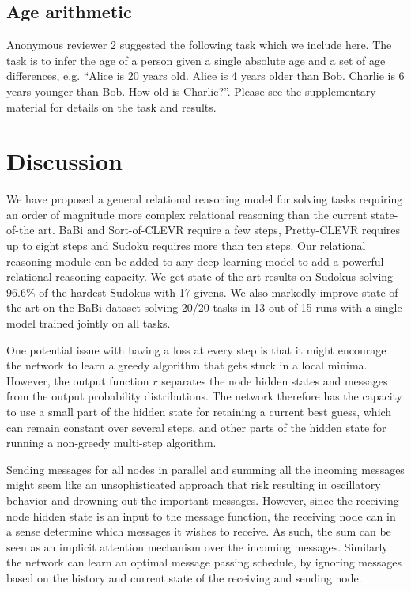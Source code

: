 \documentclass{article}
\newcommand{\rbp}[1]{

}
\begin{document}
\subsection{Age arithmetic}
Anonymous reviewer 2 suggested the following task which we include here.
The task is to infer the age of a person given a single absolute age and a set of age differences, e.g. ``Alice is 20 years old. Alice is 4 years older than Bob. Charlie is 6 years younger than Bob. How old is Charlie?''. Please see the supplementary material for details on the task and results.

\section{Discussion} 

\rbp{This section could use some Ulrich magic :)}

We have proposed a general relational reasoning model for solving tasks requiring an order of magnitude more complex relational reasoning than the current state-of-the art. BaBi and Sort-of-CLEVR require a few steps, Pretty-CLEVR requires up to eight steps and Sudoku requires more than ten steps.
Our relational reasoning module can be added to any deep learning model to add a powerful relational reasoning capacity.
We get state-of-the-art results on Sudokus solving 96.6\% of the hardest Sudokus with 17 givens.
We also markedly improve state-of-the-art on the BaBi dataset solving 20/20 tasks in 13 out of 15 runs with a single model trained jointly on all tasks.

One potential issue with having a loss at every step is that it might encourage the network to learn a greedy algorithm that gets stuck in a local minima.
However, the output function $r$ separates the node hidden states and messages from the output probability distributions.
The network therefore has the capacity to use a small part of the hidden state for retaining a current best guess, which can remain constant over several steps, and other parts of the hidden state for running a non-greedy multi-step algorithm.

Sending messages for all nodes in parallel and summing all the incoming messages might seem like an unsophisticated approach that risk resulting in oscillatory behavior and drowning out the important messages.
However, since the receiving node hidden state is an input to the message function, the receiving node can in a sense determine which messages it wishes to receive.
As such, the sum can be seen as an implicit attention mechanism over the incoming messages.
Similarly the network can learn an optimal message passing schedule, by ignoring messages based on the history and current state of the receiving and sending node.
\end{document}
